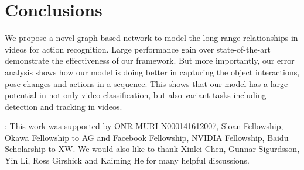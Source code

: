 \documentclass[runningheads]{llncs}
\begin{document}
\vspace{-0.1in}
\section{Conclusions}
\vspace{-0.1in}

We propose a novel graph based network to model the long range relationships in videos for action recognition. Large performance gain over state-of-the-art demonstrate the effectiveness of our framework. But more importantly, our error analysis shows how our model is doing better in capturing the object interactions, pose changes and actions in a sequence. This shows that our model has a large potential in not only video classification, but also variant tasks including detection and tracking in videos. 

\vspace{0.1in}

{: This work was supported by ONR MURI N000141612007, Sloan Fellowship, Okawa Fellowship to AG and Facebook Fellowship, NVIDIA Fellowship, Baidu Scholarship to XW. We would also like to thank Xinlei Chen, Gunnar Sigurdsson, Yin Li, Ross Girshick and Kaiming He for many helpful discussions.}


\clearpage



\end{document}
